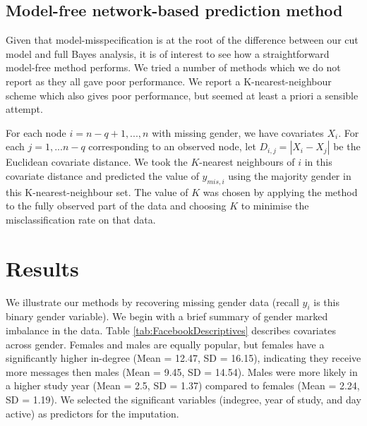 \documentclass{article}
\begin{document}
\subsection{Model-free network-based prediction method}\label{sec:modelfree}
Given that model-misspecification is at the root of the difference between our cut model and full Bayes analysis,
it is of interest to see how a straightforward model-free method performs. We tried a number of methods which we do not report as they all gave poor performance. We report a K-nearest-neighbour scheme which also gives poor performance, but seemed at least a priori a sensible attempt.

For each node $i=n-q+1,...,n$ with missing gender, we have covariates $X_i$.
For each $j=1,...n-q$ corresponding to an observed node, let $D_{i,j}=|X_i-X_j|$ be the Euclidean covariate distance. 
We took the $K$-nearest neighbours of $i$ in this covariate distance and predicted the value of $y_{mis,i}$ using 
the majority gender in this K-nearest-neighbour set. The value of $K$ was chosen by applying the method to
the fully observed part of the data and choosing $K$ to minimise the misclassification rate on that data.

\section{Results}

We illustrate our methods by recovering missing gender data (recall $y_i$ is this binary gender variable). We begin with a brief summary of gender marked imbalance in the data.
Table \ref{tab:FacebookDescriptives} describes covariates across gender. Females and males are equally popular, but females have a significantly higher in-degree (Mean = 12.47, SD = 16.15), indicating they receive more messages then males (Mean = 9.45, SD = 14.54). Males were more likely in a higher study year (Mean = 2.5, SD = 1.37) compared to females (Mean = 2.24, SD = 1.19). We selected the significant variables (indegree, year of study, and day active) as predictors for the imputation.
\end{document}
